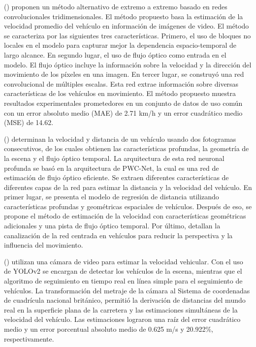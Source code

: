 \citeauthor{dong2019Vehicle} (\cite{dong2019Vehicle}) proponen un método alternativo de extremo a extremo basado en redes convolucionales tridimensionales. El método propuesto basa la estimación de la velocidad promedio del vehículo en información de imágenes de video. El método se caracteriza por las siguientes tres características. Primero, el uso de bloques no locales en el modelo para capturar mejor la dependencia espacio-temporal de largo alcance. En segundo lugar, el uso de flujo óptico como entrada en el modelo. El flujo óptico incluye la información sobre la velocidad y la dirección del movimiento de los píxeles en una imagen. En tercer lugar, se construyó una red convolucional de múltiples escalas. Esta red extrae información sobre diversas características de los vehículos en movimiento. El método propuesto muestra resultados experimentales prometedores en un conjunto de datos de uso común con un error absoluto medio (MAE) de 2.71 km/h y un error cuadrático medio (MSE) de 14.62. 

\citeauthor{song2020Learning} (\cite{song2020Learning}) determinan la velocidad y distancia de un vehículo usando dos fotogramas consecutivos, de los cuales obtienen las características profundas, la geometría de la escena y el flujo óptico temporal. La arquitectura de esta red neuronal profunda se basó en la arquitectura de PWC-Net, la cual es una red de estimación de flujo óptico eficiente. Se extraen diferentes características de diferentes capas de la red para estimar la distancia y la velocidad del vehículo. En primer lugar, se presenta el modelo de regresión de distancia utilizando características profundas y geométricas espaciales de vehículos. Después de eso, se propone el método de estimación de la velocidad con características geométricas adicionales y una pista de flujo óptico temporal. Por último, detallan la canalización de la red centrada en vehículos para reducir la perspectiva y la influencia del movimiento. 

\citeauthor{bell2020Accurate} (\cite{bell2020Accurate}) utilizan una cámara de video para estimar la velocidad vehicular. Con el uso de YOLOv2 se encargan de detectar los vehículos de la escena, mientras que el algoritmo de seguimiento en tiempo real en línea simple para el seguimiento de vehículos. La transformación del metraje de la cámara al Sistema de coordenadas de cuadrícula nacional británico, permitió la derivación de distancias del mundo real en la superficie plana de la carretera y las estimaciones simultáneas de la velocidad del vehículo. Las estimaciones lograron una raíz del error cuadrático medio y un error porcentual absoluto medio de 0.625 m/s y 20.922\%, respectivamente. 

